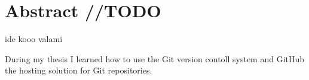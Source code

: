 \documentclass[../main.tex]{subfiles}
\begin{document}
{}
\section*{Abstract //TODO}
    ide kooo valami
    
    During my thesis I learned how to use the Git version contoll system and GitHub the hosting solution for Git repositories. 
    

\end{document}
